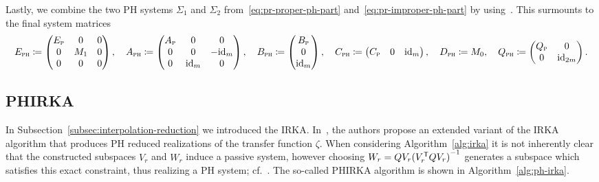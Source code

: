 Lastly, we combine the two \ac{PH} systems $\Sigma_1$ and $\Sigma_2$ from~\eqref{eq:pr-proper-ph-part} and~\eqref{eq:pr-improper-ph-part} by using~\cite[Lemma~5.6]{CGH2022}.
This surmounts to the final system matrices
\begin{equation*}
    E_\msc{ph} \coloneqq \begin{pmatrix}
        E_\msc{p} & 0 & 0 \\
        0 & M_1 & 0 \\
        0 & 0 & 0
    \end{pmatrix},\quad A_\msc{ph} \coloneqq \begin{pmatrix}
        A_\msc{p} & 0 & 0 \\
        0 & 0 & -\id[m] \\
        0 & \id[m] & 0
    \end{pmatrix},\quad B_\msc{ph} \coloneqq \begin{pmatrix}
        B_\msc{p} \\
        0 \\
        \id[m]
    \end{pmatrix},\quad C_\msc{ph} \coloneqq \begin{pmatrix}
        C_\msc{p} & 0 & \id[m]
    \end{pmatrix},\quad D_\msc{ph} \coloneqq M_0,\quad Q_\msc{ph} \coloneqq \begin{pmatrix}
        Q_\msc{p} & 0 \\
        0 & \id[2m]
    \end{pmatrix}.
\end{equation*}

\subsection{\acl{PHIRKA}}\label{subsec:ph-irka}

In Subsection~\ref{subsec:interpolation-reduction} we introduced the \ac{IRKA}.
In~\cite{Gugercin2012}, the authors propose an extended variant of the \ac{IRKA} algorithm that produces \ac{PH} reduced realizations of the transfer function $\zeta$.
When considering Algorithm~\ref{alg:irka} it is not inherently clear that the constructed subspaces $V_r$ and $W_r$ induce a passive system, however choosing $W_r = Q V_r {(V_r\trans Q V_r)}\inv$ generates a subspace which satisfies this exact constraint, thus realizing a \ac{PH} system; cf.~\cite[Section~2.4]{Breiten2022}.
The so-called \ac{PHIRKA} algorithm is shown in Algorithm~\ref{alg:ph-irka}.

